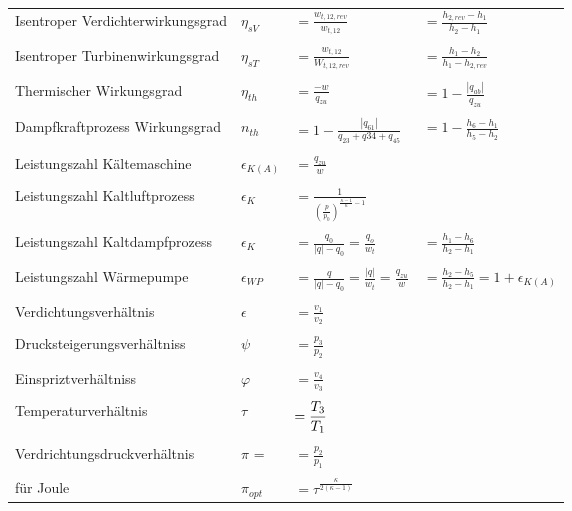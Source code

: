 \documentclass[twocolumn]{article}
\begin{document}
\begin{tabular}{llll}
	Isentroper Verdichterwirkungsgrad
	& 
	$\eta_{sV}$ & $\displaystyle = \frac{w_{t,12,rev}}{w_{t,12}}$ &$\displaystyle =\frac{h_{2,rev} - h_1}{h_2 - h_1}$ \\\\
	Isentroper  Turbinenwirkungsgrad 
	&
	$\eta_{sT}$ & $\displaystyle = \frac{w_{t,12}}{W_{t,12,rev}}$ & $ \displaystyle = \frac{h_1 - h_2}{h_1 - h_{2,rev}}$ \\\\
	Thermischer Wirkungsgrad 
	&
	$\eta_{th}$ & $\displaystyle = \frac{-w}{q_{zu}}$ &$= \displaystyle 1 - \frac{|q_{ab}|}{q_{zu}}$ \\\\
	Dampfkraftprozess Wirkungsgrad 
	&
	$n_{th}$ &$\displaystyle = 1 - \frac{|q_{61}|}{q_{23}+q{34} + q_{45}}$ 
	& 
	$\displaystyle = 1 - \frac{h_6 - h_1}{h_5 -  h_2}$ \\\\
	Leistungszahl Kältemaschine &
	$\epsilon_{K(A)}$ &$\displaystyle = \frac{q_{zu}}{w}$ \\\\
	Leistungszahl Kaltluftprozess &
	$\epsilon_{K}$ &$\displaystyle = \frac{1}{\left(\frac{p}{p_0}\right)^{\frac{\kappa - 1}{\kappa} - 1}}$ \\\\
	Leistungszahl Kaltdampfprozess &
	$\epsilon_K$ & $\displaystyle = \frac{q_0}{|q| - q_0} = \frac{q_o}{w_t}$ &$\displaystyle = \frac{h_1 - h_6}{h_2 - h_1}$ \\\\
	Leistungszahl Wärmepumpe &
	$\epsilon_{WP}$ & $\displaystyle = \frac{q}{|q| - q_0} = \frac{|q|}{w_t} = \frac{q_{zu}}{w}$ &$\displaystyle = \frac{h_2 - h_5}{h_2 - h_1} = 1 + \epsilon_{K(A)}$ \\\\
	Verdichtungsverhältnis &
	$\epsilon$ &$\displaystyle = \frac{v_1}{v_2}$ \\\\
	Drucksteigerungsverhältniss &
	$\psi$ &$\displaystyle = \frac{p_3}{p_2}$ \\\\
	Einspriztverhältniss &
	$\varphi $ &$\displaystyle = \frac{v_4}{v_3}$ \\\\
	Temperaturverhältnis &
	$\tau$ &$ \displaystyle \displaystyle =\frac{T_3}{T_1}$ \\\\
	Verdrichtungsdruckverhältnis &
	$\pi$ = & $ \displaystyle  = \frac{p_2}{p_1}$ \\\\
	für Joule &
	$\pi_{opt}$ & $ \displaystyle = \tau^{\frac{\kappa}{2(\kappa -1)}}$ \\
	
	
\end{tabular}
\end{document}
